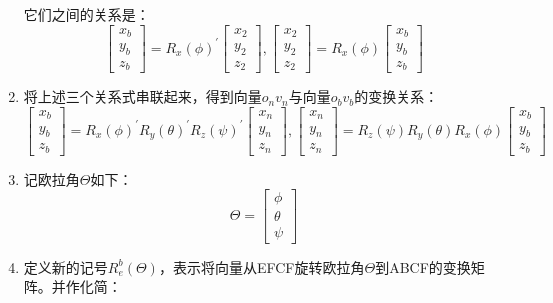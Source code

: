 \documentclass{article} %
\numberwithin{equation}{section} %
\begin{document}
\begin{enumerate}
它们之间的关系是：
\begin{equation}
\begin{bmatrix}x_b\\y_b\\z_b\end{bmatrix} = R_x(\phi)^{'}\begin{bmatrix}x_2\\y_2\\z_2\end{bmatrix},
\begin{bmatrix}x_2\\y_2\\z_2\end{bmatrix} = R_x(\phi)\begin{bmatrix}x_b\\y_b\\z_b\end{bmatrix}
\end{equation}
\item 将上述三个关系式串联起来，得到向量$o_nv_n$与向量$o_bv_b$的变换关系：
\begin{equation}
\begin{bmatrix}x_b\\y_b\\z_b\end{bmatrix} = R_x(\phi)^{'}R_y(\theta)^{'}R_z(\psi)^{'}\begin{bmatrix}x_n\\y_n\\z_n\end{bmatrix},
\begin{bmatrix}x_n\\y_n\\z_n\end{bmatrix} = R_z(\psi)R_y(\theta)R_x(\phi)\begin{bmatrix}x_b\\y_b\\z_b\end{bmatrix}
\end{equation}
\item 记欧拉角$\Theta$如下：
\begin{equation}
\Theta=\begin{bmatrix}\phi\\ \theta\\ \psi\end{bmatrix}
\end{equation}
\item 定义新的记号${R}_{e}^{b}(\Theta)$，表示将向量从EFCF旋转欧拉角$\Theta$到ABCF的变换矩阵。并作化简：

\end{enumerate}
\end{document}
